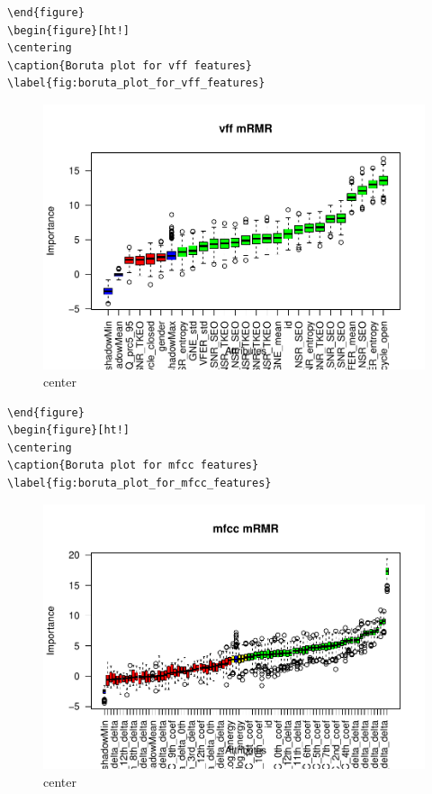 \documentclass[
]{article}
\begin{document}
\begin{verbatim}
\end{figure}
\begin{figure}[ht!]
\centering
\caption{Boruta plot for vff features}
\label{fig:boruta_plot_for_vff_features}
\end{verbatim}

\begin{figure}
\includegraphics[width=1\linewidth,height=1\textheight]{figure/unnamed-chunk-7-4} \caption{center}\label{fig:unnamed-chunk-7-4}
\end{figure}

\begin{verbatim}
\end{figure}
\begin{figure}[ht!]
\centering
\caption{Boruta plot for mfcc features}
\label{fig:boruta_plot_for_mfcc_features}
\end{verbatim}

\begin{figure}
\includegraphics[width=1\linewidth,height=1\textheight]{figure/unnamed-chunk-7-5} \caption{center}\label{fig:unnamed-chunk-7-5}
\end{figure}
\end{document}
